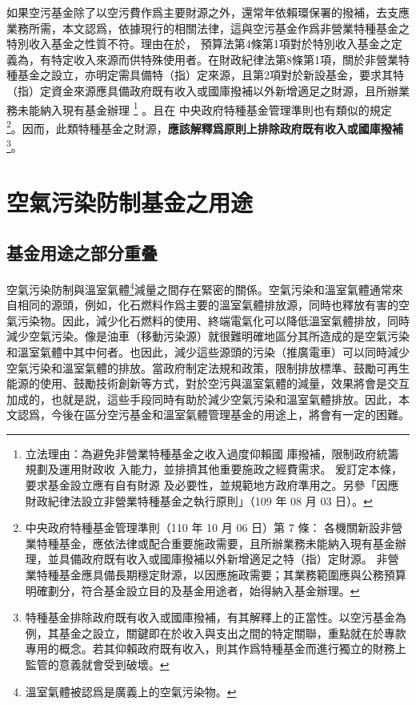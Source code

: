 \documentclass[12pt,a4paper]{article}
\begin{document}
如果空污基金除了以空污費作爲主要財源之外，還常年依賴環保署的撥補，去支應業務所需，本文認爲，依據現行的相關法律，這與空污基金作爲非營業特種基金之特別收入基金之性質不符。理由在於，
預算法第4條第1項對於特別收入基金之定義為，有特定收入來源而供特殊使用者。在財政紀律法第8條第1項，關於非營業特種基金之設立，亦明定需具備特（指）定來源，且第2項對於新設基金，要求其特（指）定資金來源應具備政府既有收入或國庫撥補以外新增適足之財源，且所辦業務未能納入現有基金辦理
\footnote{立法理由：為避免非營業特種基金之收入過度仰賴國
庫撥補，限制政府統籌規劃及運用財政收
入能力，並排擠其他重要施政之經費需求。
爰訂定本條，要求基金設立應有自有財源
及必要性，並規範地方政府準用之。另參「因應財政紀律法設立非營業特種基金之執行原則」（109 年 08 月 03 日）。}
。且在	中央政府特種基金管理準則也有類似的規定
\footnote{	中央政府特種基金管理準則（110 年 10 月 06 日）第 7 條：
各機關新設非營業特種基金，應依法律或配合重要施政需要，且所辦業務未能納入現有基金辦理，並具備政府既有收入或國庫撥補以外新增適足之特（指）定財源。
非營業特種基金應具備長期穩定財源，以因應施政需要；其業務範圍應與公務預算明確劃分，符合基金設立目的及基金用途者，始得納入基金辦理。}。因而，此類特種基金之財源，\textbf{應該解釋爲原則上排除政府既有收入或國庫撥補}\footnote{特種基金排除政府既有收入或國庫撥補，有其解釋上的正當性。以空污基金為例，其基金之設立，關鍵即在於收入與支出之間的特定關聯，重點就在於專款專用的概念。若其仰賴政府既有收入，則其作爲特種基金而進行獨立的財務上監管的意義就會受到破壞。
}。

\section{空氣污染防制基金之用途}



\subsection{基金用途之部分重叠}

空氣污染防制與溫室氣體\footnote{溫室氣體被認爲是廣義上的空氣污染物。}減量之間存在緊密的關係。空氣污染和溫室氣體通常來自相同的源頭，例如，化石燃料作爲主要的溫室氣體排放源，同時也釋放有害的空氣污染物。因此，減少化石燃料的使用、終端電氣化可以降低溫室氣體排放，同時減少空氣污染。像是油車（移動污染源）就很難明確地區分其所造成的是空氣污染和溫室氣體中其中何者。也因此，減少這些源頭的污染（推廣電車）可以同時減少空氣污染和溫室氣體的排放。當政府制定法規和政策，限制排放標準、鼓勵可再生能源的使用、鼓勵技術創新等方式，對於空污與溫室氣體的減量，效果將會是交互加成的，也就是説，這些手段同時有助於減少空氣污染和溫室氣體排放。因此，本文認爲，今後在區分空污基金和溫室氣體管理基金的用途上，將會有一定的困難。
\end{document}
